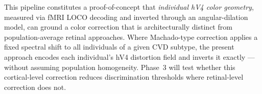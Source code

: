 This pipeline constitutes a proof-of-concept that \emph{individual hV4 color geometry}, measured via fMRI LOCO decoding and inverted through an angular-dilation model, can ground a color correction that is architecturally distinct from population-average retinal approaches.
Where Machado-type correction applies a fixed spectral shift to all individuals of a given CVD subtype, the present approach encodes each individual's hV4 distortion field and inverts it exactly --- without assuming population homogeneity.
Phase~3 will test whether this cortical-level correction reduces discrimination thresholds where retinal-level correction does not.
